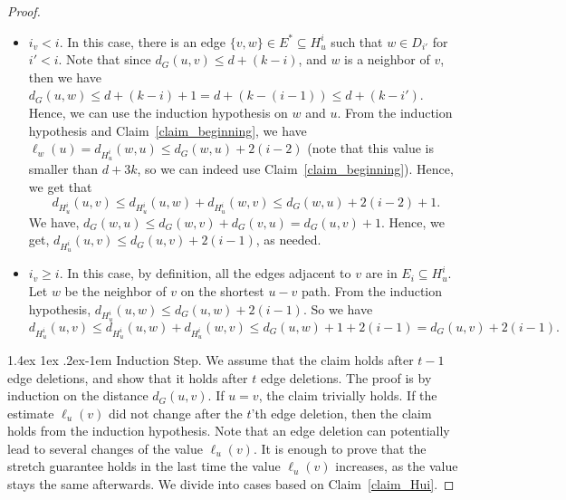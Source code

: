 \documentclass[11pt]{article}
\makeatletter
\theoremstyle{definition}
\theoremstyle{remark}
\newcommand{\mtodo}[1]{\todo[color=red!20]{M: #1}}
\renewcommand{\paragraph}{%
  \@startsection{paragraph}{4}%
  {\z@}{1.4ex \@plus 1ex \@minus .2ex}{-1em}%
  {\normalfont\normalsize\bfseries}%
}
\makeatother
\begin{document}
\begin{titlepage}
\begin{proof}
\begin{itemize}
    \item [Case 1:] $i_v < i$. In this case, there is an edge $\{v,w\} \in E^* \subseteq H_u^i$ such that $w \in D_{i'}$ for $i' < i$. Note that since $d_G(u,v) \leq d+(k-i)$, and $w$ is a neighbor of $v$, then we have $d_G(u,w) \leq d +(k-i)+1 = d+(k-(i-1)) \leq d+(k-i')$. Hence, we can use the induction hypothesis on $w$ and $u$. From the induction hypothesis and Claim~\ref{claim_beginning}, we have 
    $\ell_w(u) = d_{H_u^i}(w,u) \leq d_G(w,u)+2(i-2)$ (note that this value is smaller than $d+3k$, so we can indeed use Claim~\ref{claim_beginning}). 
    Hence, we get that $$d_{H_u^i}(u,v) \leq d_{H_u^i}(u,w) + d_{H_u^i}(w,v) \leq d_G(w,u) + 2(i-2)+1.$$ We have, $d_G(w,u) \leq d_G(w,v)+d_G(v,u)=d_G(u,v)+1$.
    Hence, we get, $d_{H_u^i}(u,v) \leq d_G(u,v)+2(i-1)$, as needed.
    \item [Case 2:] $i_v \geq i$. In this case, by definition, all the edges adjacent to $v$ are in $E_i \subseteq H_u^i$. Let $w$ be the neighbor of $v$ on the shortest $u-v$ path. From the induction hypothesis, $d_{H_u^i}(u,w) \leq d_G(u,w)+2(i-1)$. So we have $$d_{H_u^i}(u,v) \leq d_{H_u^i}(u,w)+d_{H_u^i}(w,v) \leq d_G(u,w)+1+2(i-1)=d_G(u,v)+2(i-1).$$
\end{itemize}


\paragraph{Induction Step.} We assume that the claim holds after $t-1$ edge deletions, and show that it holds after $t$ edge deletions. The proof is by induction on the distance $d_G(u,v)$. If $u=v$, the claim trivially holds. If the estimate $\ell_u(v)$ did not change after the $t$'th edge deletion, then the claim holds from the induction hypothesis. Note that an edge deletion can potentially lead to several changes of the value $\ell_u(v)$. It is enough to prove that the stretch guarantee holds in the last time the value $\ell_u(v)$ increases, as the value stays the same afterwards. We divide into cases based on Claim~\ref{claim_Hui}.


\end{proof}
\end{titlepage}
\end{document}
